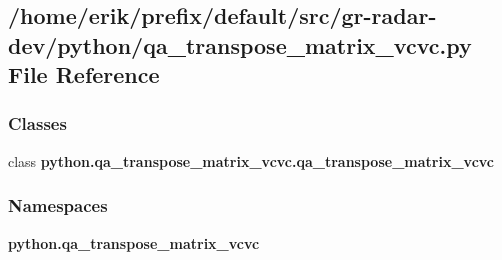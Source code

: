 \subsection{/home/erik/prefix/default/src/gr-\/radar-\/dev/python/qa\+\_\+transpose\+\_\+matrix\+\_\+vcvc.py File Reference}
\label{qa__transpose__matrix__vcvc_8py}
\subsubsection*{Classes}
\begin{DoxyCompactItemize}
\item 
class {\bf python.\+qa\+\_\+transpose\+\_\+matrix\+\_\+vcvc.\+qa\+\_\+transpose\+\_\+matrix\+\_\+vcvc}
\end{DoxyCompactItemize}
\subsubsection*{Namespaces}
\begin{DoxyCompactItemize}
\item 
 {\bf python.\+qa\+\_\+transpose\+\_\+matrix\+\_\+vcvc}
\end{DoxyCompactItemize}
